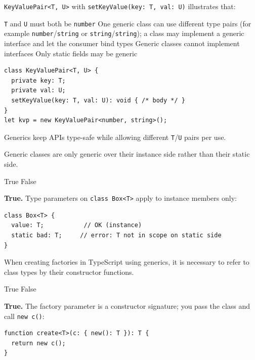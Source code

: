 \question[4]
\texttt{KeyValuePair<T, U>} with \texttt{setKeyValue(key: T, val: U)} illustrates that:
\begin{choices}
  \choice \texttt{T} and \texttt{U} must both be \texttt{number}
  \CorrectChoice One generic class can use different type pairs (for example \texttt{number}/\texttt{string} or \texttt{string}/\texttt{string}); a class may implement a generic interface and let the consumer bind types
  \choice Generic classes cannot implement interfaces
  \choice Only static fields may be generic
\end{choices}
\begin{solution}
\begin{lstlisting}[style=ts]
class KeyValuePair<T, U> {
  private key: T;
  private val: U;
  setKeyValue(key: T, val: U): void { /* body */ }
}
let kvp = new KeyValuePair<number, string>();
\end{lstlisting}
  Generics keep APIs type-safe while allowing different \lstinline[style=tsinline]{T}/\lstinline[style=tsinline]{U} pairs per use.
\end{solution}

\question[4]
Generic classes are only generic over their instance side rather than their static side.
\begin{choices}
  \CorrectChoice True
  \choice False
\end{choices}
\begin{solution}
  \textbf{True.} Type parameters on \lstinline[style=tsinline]{class Box<T>} apply to instance members only:
\begin{lstlisting}[style=ts]
class Box<T> {
  value: T;           // OK (instance)
  static bad: T;     // error: T not in scope on static side
}
\end{lstlisting}
\end{solution}

\question[4]
When creating factories in TypeScript using generics, it is necessary to refer to class types by their constructor functions.
\begin{choices}
  \CorrectChoice True
  \choice False
\end{choices}
\begin{solution}
  \textbf{True.} The factory parameter is a constructor signature; you pass the class and call \lstinline[style=tsinline]{new c()}:
\begin{lstlisting}[style=ts]
function create<T>(c: { new(): T }): T {
  return new c();
}
\end{lstlisting}
\end{solution}

